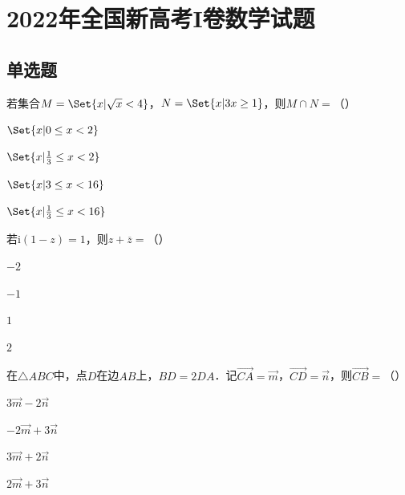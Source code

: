 \documentclass[fontset=founder]{ucedubook}
\begin{document}
\chapter*{2022年全国新高考I卷数学试题}

\section{单选题}

\begin{ti}
若集合$M = \Set{ x | \sqrt{x} < 4 }$，$N = \Set{ x | 3x \geq 1 }$，则$M \cap N =$（\qquad）

\begin{choices}
  \item $\Set{ x | 0 \leq x < 2 }$
  \item $\Set{ x | \frac{1}{3} \leq x < 2 }$
  \item $\Set{ x | 3 \leq x < 16 }$
  \item $\Set{ x | \frac{1}{3} \leq x < 16 }$
\end{choices}
\end{ti}


\begin{ti}
若$\mathrm{i}(1 - z) = 1$，则$z + \overline{z} =$（\qquad）

\begin{choices}
  \item $- 2$
  \item $- 1$
  \item $1$
  \item $2$
\end{choices}
\end{ti}


\begin{ti}
在$\triangle ABC$中，点$D$在边$AB$上，$BD = 2DA$．记$\overrightarrow{CA} = \overrightarrow{m}$，$\overrightarrow{CD} = \overrightarrow{n}$，则$\overrightarrow{CB} =$（\qquad）

\begin{choices}
  \item $3\overrightarrow{m} - 2\overrightarrow{n}$
  \item $- 2\overrightarrow{m} + 3\overrightarrow{n}$
  \item $3\overrightarrow{m} + 2\overrightarrow{n}$
  \item $2\overrightarrow{m} + 3\overrightarrow{n}$
\end{choices}
\end{ti}
\end{document}
